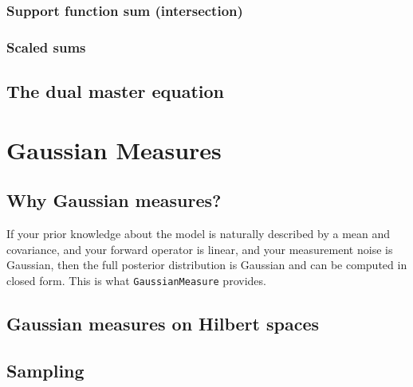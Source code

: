 \documentclass[11pt,twoside,openright]{book}
\theoremstyle{plain}
\theoremstyle{definition}
\theoremstyle{remark}
\begin{document}
\subsection{Support function sum (intersection)}
\label{ssec:support-sum}

\subsection{Scaled sums}
\label{ssec:scaled-sum}

\section{The dual master equation}
\label{sec:dual-master}


\chapter{Gaussian Measures}
\label{ch:gaussian-measures}

\section{Why Gaussian measures?}
\label{sec:why-gaussian}

\begin{whybox}
If your prior knowledge about the model is naturally described by a mean
and covariance, and your forward operator is linear, and your measurement
noise is Gaussian, then the full posterior distribution is Gaussian and
can be computed in closed form. This is what \texttt{GaussianMeasure}
provides.
\end{whybox}

\section{Gaussian measures on Hilbert spaces}
\label{sec:gaussian-definition}

\section{Sampling}
\label{sec:gaussian-sampling}
\end{document}
